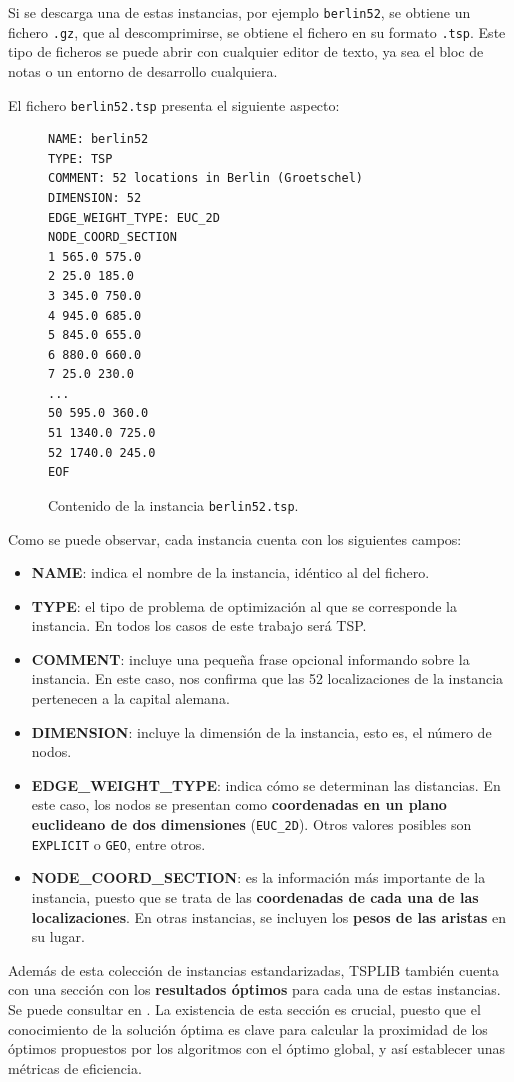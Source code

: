 Si se descarga una de estas instancias, por ejemplo \texttt{berlin52}, se obtiene un fichero \texttt{.gz}, que al descomprimirse,
se obtiene el fichero en su formato \texttt{.tsp}. Este tipo de ficheros se puede abrir con cualquier editor de texto, ya sea el 
bloc de notas o un entorno de desarrollo cualquiera.

El fichero \texttt{berlin52.tsp} presenta el siguiente aspecto:
\begin{figure}[htbp]
  \centering
\begin{verbatim}
NAME: berlin52
TYPE: TSP
COMMENT: 52 locations in Berlin (Groetschel)
DIMENSION: 52
EDGE_WEIGHT_TYPE: EUC_2D
NODE_COORD_SECTION
1 565.0 575.0
2 25.0 185.0
3 345.0 750.0
4 945.0 685.0
5 845.0 655.0
6 880.0 660.0
7 25.0 230.0
...
50 595.0 360.0
51 1340.0 725.0
52 1740.0 245.0
EOF
\end{verbatim}
  \caption{Contenido de la instancia \texttt{berlin52.tsp}.}
  \label{fig:inst_info}
\end{figure}

Como se puede observar, cada instancia cuenta con los siguientes campos:
\begin{itemize}
  \item \textbf{NAME}: indica el nombre de la instancia, idéntico al del fichero.
  \item \textbf{TYPE}: el tipo de problema de optimización al que se corresponde la instancia. En todos los casos de este 
  trabajo será TSP.
  \item \textbf{COMMENT}: incluye una pequeña frase opcional informando sobre la instancia. En este caso, nos confirma que las
  52 localizaciones de la instancia pertenecen a la capital alemana.
  \item \textbf{DIMENSION}: incluye la dimensión de la instancia, esto es, el número de nodos.
  \item \textbf{EDGE\_WEIGHT\_TYPE}: indica cómo se determinan las distancias. En este caso, los nodos se presentan como \textbf{
  coordenadas en un plano euclideano de dos dimensiones} (\texttt{EUC\_2D}). Otros valores posibles son \texttt{EXPLICIT} o 
  \texttt{GEO}, entre otros.
  \item \textbf{NODE\_COORD\_SECTION}: es la información más importante de la instancia, puesto que se trata de las \textbf{
  coordenadas de cada una de las localizaciones}. En otras instancias, se incluyen los \textbf{pesos de las aristas} en su lugar.
\end{itemize}

Además de esta colección de instancias estandarizadas, TSPLIB también cuenta con una sección con los \textbf{resultados óptimos}
para cada una de estas instancias. Se puede consultar en \cite{tsp_best}. La existencia de esta sección es crucial, puesto que 
el conocimiento de la solución óptima es clave para calcular la proximidad de los óptimos propuestos por los algoritmos con el 
óptimo global, y así establecer unas métricas de eficiencia.

